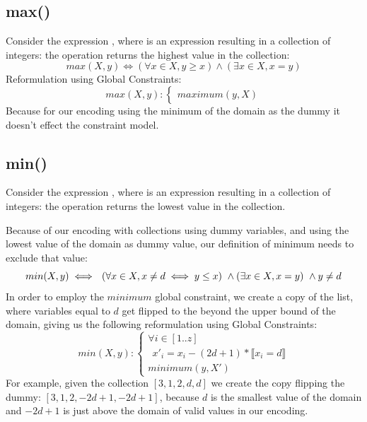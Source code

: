 \subsection{max()}
Consider the expression , where  is an expression resulting in a collection of integers: the  operation returns the highest value in the  collection:
\begin{equation}\label{def:max}
    max(X,y) \iff (\forall x \in X, y \geq x) \wedge (\exists x \in X, x=y) 
\end{equation}
Reformulation using Global Constraints:
\begin{equation}\label{csp:max}
    max(X,y):
    \begin{cases}
        maximum(y,X)
    \end{cases}
\end{equation}
Because for our encoding using the minimum of the domain as the dummy it doesn't effect the constraint model.

\subsection{min()}
Consider the expression , where  is an expression resulting in a collection of integers: the  operation returns the lowest value in the  collection.

Because of our encoding with collections using dummy variables, and using the lowest value of the domain as dummy value, our definition of minimum needs to exclude that value:
\begin{equation}\label{def:min}
    min(X,y) \iff \\
    ~~(\forall x \in X, x\neq d \iff y \leq x)\\
    ~\wedge (\exists x \in X, x=y)\\
    ~\wedge y\neq d
\end{equation}
In order to employ the $minimum$ global constraint, we create a copy of the list, where variables equal to $d$ get flipped to the beyond the upper bound of the domain, giving us the following reformulation using Global Constraints:
\begin{equation}\label{csp:min}
    min(X,y):
    \begin{cases}
        \forall i \in [1..z]\\
        ~~x'_i = x_i - (2d+1)*\llbracket x_i=d \rrbracket \\
        minimum(y,X')
    \end{cases}
\end{equation}
For example, given the collection $[3,1,2,d,d]$ we create the copy flipping the dummy: $[3,1,2,-2d+1,-2d+1]$, because $d$ is the smallest value of the domain and $-2d+1$ is just above the domain of valid values in our encoding.